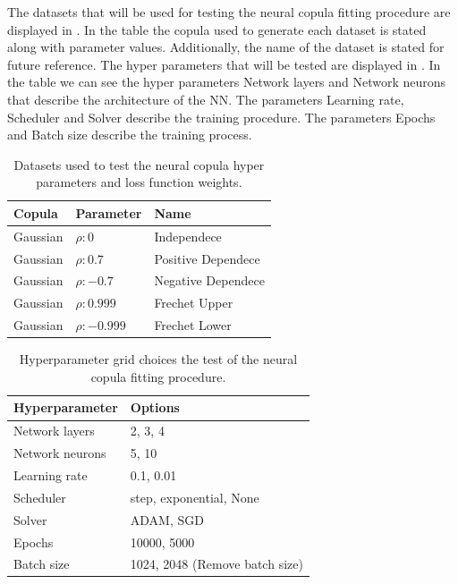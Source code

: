 The datasets that will be used for testing the neural copula fitting procedure are displayed in . In the table the copula used to generate each dataset is stated along with parameter values. Additionally, the name of the dataset is stated for future reference. The hyper parameters that will be tested are displayed in . In the table we can see the hyper parameters Network layers and Network neurons that describe the architecture of the \gls{NN}. The parameters Learning rate, Scheduler and Solver describe the training procedure. The parameters Epochs and Batch size describe the training process. 

\begin{table}[h!]
    \centering
    \caption{Datasets used to test the neural copula hyper parameters and loss function weights.}
    \begin{tabular}{lll}
    \textbf{Copula} & \textbf{Parameter} & \textbf{Name}  \\
    \hline
    Gaussian & $\rho:0$ & Independece \\
    Gaussian & $\rho:0.7$ & Positive Dependece \\
    Gaussian & $\rho:-0.7$ & Negative Dependece  \\
    Gaussian & $\rho:0.999$ & Frechet Upper \\
    Gaussian & $\rho:-0.999$ & Frechet Lower \\
    \end{tabular}
    \label{tab:DatasetsTestedOn}
\end{table}

\begin{table}[h!]
    \centering
    \caption{Hyperparameter grid choices the test of the neural copula fitting procedure.}
    \begin{tabular}{ll}
    \textbf{Hyperparameter} & \textbf{Options} \\
    \hline
    Network layers & 2, 3, 4 \\
    Network neurons & 5, 10 \\
    Learning rate & 0.1, 0.01 \\
    Scheduler & step, exponential, None \\
    Solver & ADAM, SGD \\
    Epochs & 10000, 5000 \\
    Batch size & 1024, 2048 (Remove batch size) \\
    \end{tabular}
    \label{tab:se_hyperparams}
\end{table}
    

